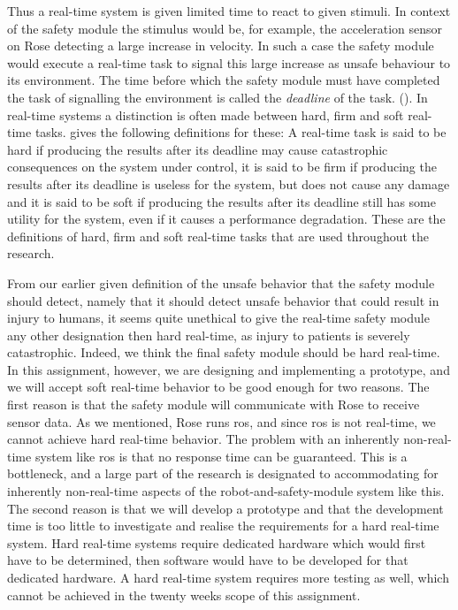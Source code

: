 \documentclass[12pt]{scrreprt}
\begin{document}
Thus a real-time system is given limited time to react to given stimuli. In context of the safety module the stimulus would be, for example, the acceleration sensor on Rose detecting a large increase in velocity. In such a case the safety module would execute a real-time task to signal this large increase as unsafe behaviour to its environment. The time before which the safety module must have completed the task of signalling the environment is called the \textit{deadline} of the task. (\cite{realtime_systems}). In real-time systems a distinction is often made between hard, firm and soft real-time tasks. \cite{buttazo} gives the following definitions for these: A real-time task is said to be hard if producing the results after its deadline
may cause catastrophic consequences on the system under control, it is said to be firm if producing the results after its deadline is useless for the system, but does not cause any damage and it is said to be soft if producing the results after its deadline still has some utility for the system, even if it causes a performance degradation. These are the definitions of hard, firm and soft real-time tasks that are used throughout the research.
\par
From our earlier given definition of the unsafe behavior that the safety module should detect, namely that it should detect unsafe behavior that could result in injury to humans, it seems quite unethical to give the real-time safety module any other designation then hard real-time, as injury to patients is severely catastrophic. Indeed, we think the final safety module should be hard real-time. In this assignment, however, we are designing and implementing a prototype, and we will accept soft real-time behavior to be good enough for two reasons. The first reason is that the safety module will communicate with Rose to receive sensor data. As we mentioned, Rose runs \acrlong{ros}, and since \acrlong{ros} is not real-time, we cannot achieve hard real-time behavior. The problem with an inherently non-real-time system like \acrlong{ros} is that no response time can be guaranteed. This is a bottleneck, and a large part of the research is designated to accommodating for inherently non-real-time aspects of the robot-and-safety-module system like this. The second reason is that we will develop a prototype and that the development time is too little to investigate and realise the requirements for a hard real-time system. Hard real-time systems require dedicated hardware which would first have to be determined, then software would have to be developed for that dedicated hardware. A hard real-time system requires more testing as well, which cannot be achieved in the twenty weeks scope of this assignment.
\end{document}

